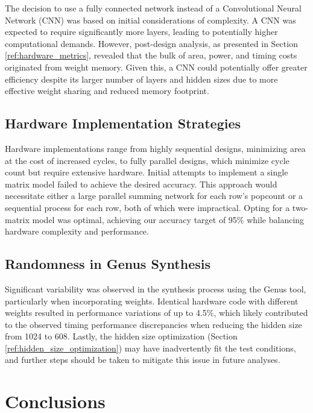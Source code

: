 \documentclass[conference]{IEEEtran}
\begin{document}
The decision to use a fully connected network instead of a Convolutional Neural Network (CNN) was based on initial considerations of complexity. A CNN was expected to require significantly more layers, leading to potentially higher computational demands. However, post-design analysis, as presented in Section \ref{ref:hardware_metrics}, revealed that the bulk of area, power, and timing costs originated from weight memory. Given this, a CNN could potentially offer greater efficiency despite its larger number of layers and hidden sizes due to more effective weight sharing and reduced memory footprint.

\subsection{Hardware Implementation Strategies}

Hardware implementations range from highly sequential designs, minimizing area at the cost of increased cycles, to fully parallel designs, which minimize cycle count but require extensive hardware. Initial attempts to implement a single matrix model failed to achieve the desired accuracy. This approach would necessitate either a large parallel summing network for each row's popcount or a sequential process for each row, both of which were impractical. Opting for a two-matrix model was optimal, achieving our accuracy target of 95\% while balancing hardware complexity and performance.

\subsection{Randomness in Genus Synthesis}

Significant variability was observed in the synthesis process using the Genus \cite{genus} tool, particularly when incorporating weights. Identical hardware code with different weights resulted in performance variations of up to 4.5\%, which likely contributed to the observed timing performance discrepancies when reducing the hidden size from 1024 to 608. Lastly, the hidden size optimization (Section \ref{ref:hidden_size_optimization}) may have inadvertently fit the test conditions, and further steps should be taken to mitigate this issue in future analyses.


\section{Conclusions}
\label{sec:conclusions}
\end{document}
